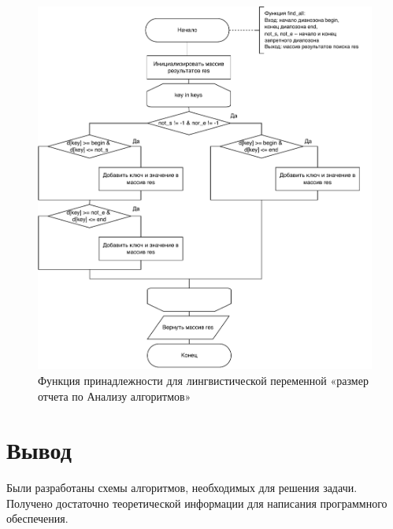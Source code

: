     \begin{figure}[h!]
            \centering
            \includegraphics[scale=0.9]{img/alg.pdf}
            \caption{Функция принадлежности для лингвистической переменной «размер отчета по Анализу алгоритмов»}
            \label{alg:1}
        \end{figure}
        \newpage

	\section*{Вывод}
    \par Были разработаны схемы алгоритмов, необходимых для решения задачи. Получено достаточно теоретической информации для написания программного обеспечения.
\newpage
